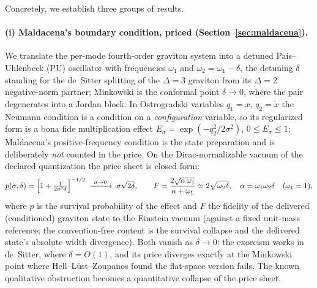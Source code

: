 \documentclass[11pt]{article}
\theoremstyle{definition}
\theoremstyle{remark}
\begin{document}
Concretely, we establish three groups of results.

\paragraph{(i) Maldacena's boundary condition, priced
(Section~\ref{sec:maldacena}).}
We translate the per-mode fourth-order graviton system into a detuned
Pais--Uhlenbeck (PU) oscillator with frequencies
$\omega_{1}$ and $\omega_{2}=\omega_{1}-\delta$, the detuning
$\delta$ standing for the de~Sitter splitting of the
$\Delta=3$ graviton from its $\Delta=2$ negative-norm partner;
Minkowski is the conformal point $\delta\to0$, where the pair
degenerates into a Jordan block. In Ostrogradski variables
$q_{1}=x$, $q_{2}=\dot x$ the Neumann condition is a condition on a
\emph{configuration} variable, so its regularized form is a bona fide
multiplication effect
$E_{\sigma}=\exp(-q_{2}^{2}/2\sigma^{2})$, $0\le E_{\sigma}\le1$;
Maldacena's positive-frequency condition is the state preparation and
is deliberately \emph{not} counted in the price. On the
Dirac-normalizable vacuum of the declared quantization the price
sheet is closed form:
\[
p(\sigma,\delta)=\Bigl[1+\tfrac{1}{2\sigma^{2}\delta}\Bigr]^{-1/2}
\;\xrightarrow{\ \sigma\to0\ }\;\sigma\sqrt{2\delta},
\qquad
F=\frac{2\sqrt{\alpha\,\omega_{1}}}{\alpha+\omega_{1}}
\simeq2\sqrt{\omega_{2}\delta},
\quad \alpha=\omega_{1}\omega_{2}\delta \quad(\omega_{1}=1),
\]
where $p$ is the survival probability of the effect and $F$ the
fidelity of the delivered (conditioned) graviton state to the
Einstein vacuum (against a fixed unit-mass reference; the
convention-free content is the survival collapse and the delivered
state's absolute width divergence). Both vanish as $\delta\to0$: the exorcism works in
de~Sitter, where $\delta=O(1)$, and its price diverges exactly at the
Minkowski point where Hell--L\"ust--Zoupanos found the flat-space
version fails. The known qualitative obstruction becomes a
quantitative collapse of the price sheet.
\end{document}

